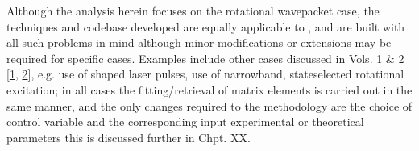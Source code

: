 \documentclass[letterpaper,table,10pt,english]{jupyterBook}
\begin{document}
\sphinxAtStartPar
Although the analysis herein focuses on the rotational wavepacket case, the techniques and codebase developed are equally applicable to , and are built with all such problems in mind \sphinxhyphen{} although minor modifications or extensions may be required for specific cases. Examples include other cases discussed in  Vols. 1 \& 2 {[}\hyperlink{cite.backmatter/bibliography:id613}{1}, \hyperlink{cite.backmatter/bibliography:id614}{2}{]}, e.g. use of shaped laser pulses, use of narrow\sphinxhyphen{}band, state\sphinxhyphen{}selected rotational excitation; in all cases the fitting/retrieval of matrix elements is carried out in the same manner, and the only changes required to the methodology are the choice of control variable and the corresponding input experimental or theoretical parameters \sphinxhyphen{} this is discussed further in Chpt. XX.
\end{document}
